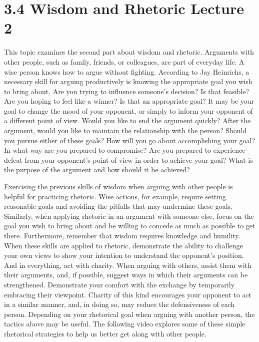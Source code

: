 \documentclass[
]{book}
\begin{document}
\hypertarget{wisdom-and-rhetoric-lecture-2}{%
\section*{3.4 Wisdom and Rhetoric Lecture 2}\label{wisdom-and-rhetoric-lecture-2}}

This topic examines the second part about wisdom and rhetoric. Arguments with other people, such as family, friends, or colleagues, are part of everyday life. A wise person knows how to argue without fighting. According to Jay Heinrichs, a necessary skill for arguing productively is knowing the appropriate goal you wish to bring about. Are you trying to influence someone's decision? Is that feasible? Are you hoping to feel like a winner? Is that an appropriate goal? It may be your goal to change the mood of your opponent, or simply to inform your opponent of a different point of view. Would you like to end the argument quickly? After the argument, would you like to maintain the relationship with the person? Should you pursue either of these goals? How will you go about accomplishing your goal? In what way are you prepared to compromise? Are you prepared to experience defeat from your opponent's point of view in order to achieve your goal? What is the purpose of the argument and how should it be achieved?

Exercising the previous skills of wisdom when arguing with other people is helpful for practicing rhetoric. Wise actions, for example, require setting reasonable goals and avoiding the pitfalls that may undermine these goals. Similarly, when applying rhetoric in an argument with someone else, focus on the goal you wish to bring about and be willing to concede as much as possible to get there. Furthermore, remember that wisdom requires knowledge and humility. When these skills are applied to rhetoric, demonstrate the ability to challenge your own views to show your intention to understand the opponent's position. And in everything, act with charity. When arguing with others, assist them with their arguments, and, if possible, suggest ways in which their arguments can be strengthened. Demonstrate your comfort with the exchange by temporarily embracing their viewpoint. Charity of this kind encourages your opponent to act in a similar manner, and, in doing so, may reduce the defensiveness of each person. Depending on your rhetorical goal when arguing with another person, the tactics above may be useful. The following video explores some of these simple rhetorical strategies to help us better get along with other people.
\end{document}
